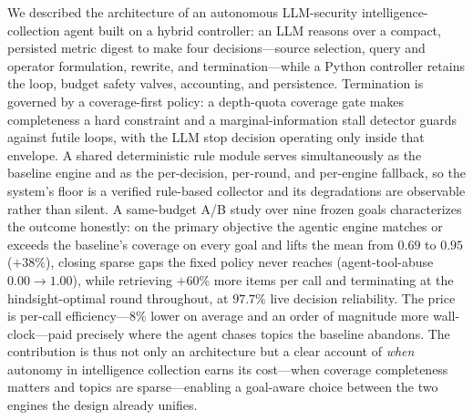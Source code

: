 \documentclass[conference]{IEEEtran}
\begin{document}
We described the architecture of an autonomous LLM-security intelligence-collection agent built on a hybrid controller: an LLM reasons over a compact, persisted metric digest to make four decisions---source selection, query and operator formulation, rewrite, and termination---while a Python controller retains the loop, budget safety valves, accounting, and persistence. Termination is governed by a coverage-first policy: a depth-quota coverage gate makes completeness a hard constraint and a marginal-information stall detector guards against futile loops, with the LLM stop decision operating only inside that envelope. A shared deterministic rule module serves simultaneously as the baseline engine and as the per-decision, per-round, and per-engine fallback, so the system's floor is a verified rule-based collector and its degradations are observable rather than silent. A same-budget A/B study over nine frozen goals characterizes the outcome honestly: on the primary objective the agentic engine matches or exceeds the baseline's coverage on every goal and lifts the mean from $0.69$ to $0.95$ ($+38\%$), closing sparse gaps the fixed policy never reaches (agent-tool-abuse $0.00\!\to\!1.00$), while retrieving $+60\%$ more items per call and terminating at the hindsight-optimal round throughout, at $97.7\%$ live decision reliability. The price is per-call efficiency---$8\%$ lower on average and an order of magnitude more wall-clock---paid precisely where the agent chases topics the baseline abandons. The contribution is thus not only an architecture but a clear account of \emph{when} autonomy in intelligence collection earns its cost---when coverage completeness matters and topics are sparse---enabling a goal-aware choice between the two engines the design already unifies.



\end{document}
